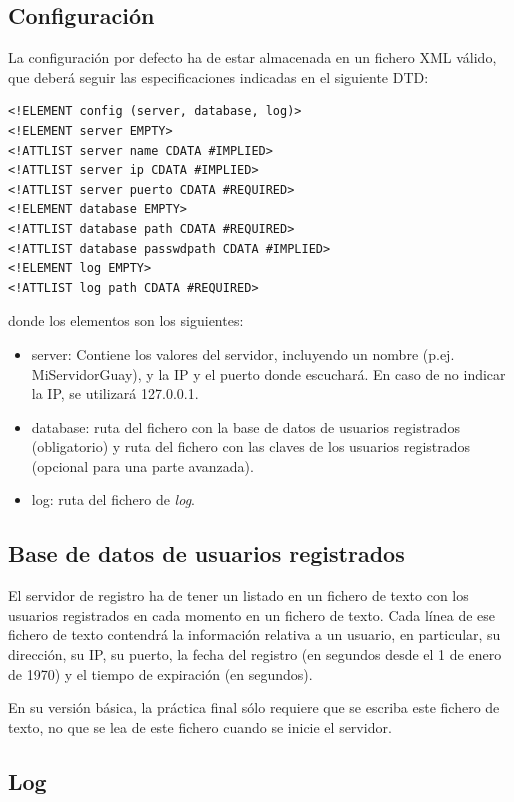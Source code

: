 \documentclass[a4paper,11pt]{article}
\begin{document}
\subsection{Configuración}

  La configuración por defecto ha de estar almacenada en un fichero XML válido, que deberá seguir las especificaciones indicadas en el siguiente DTD:

\begin{verbatim}
<!ELEMENT config (server, database, log)>
<!ELEMENT server EMPTY>
<!ATTLIST server name CDATA #IMPLIED>
<!ATTLIST server ip CDATA #IMPLIED>
<!ATTLIST server puerto CDATA #REQUIRED>
<!ELEMENT database EMPTY>
<!ATTLIST database path CDATA #REQUIRED>
<!ATTLIST database passwdpath CDATA #IMPLIED>
<!ELEMENT log EMPTY>
<!ATTLIST log path CDATA #REQUIRED>
\end{verbatim}

donde los elementos son los siguientes:

\begin{itemize}
  \item server: Contiene los valores del servidor, incluyendo un nombre (p.ej. MiServidorGuay), y la IP y el puerto donde escuchará. En caso de no indicar la IP, se utilizará 127.0.0.1.
  \item database: ruta del fichero con la base de datos de usuarios registrados (obligatorio) y ruta del fichero con las claves de los usuarios registrados (opcional para una parte avanzada).
  \item log: ruta del fichero de \emph{log}.
\end{itemize}

\subsection{Base de datos de usuarios registrados}

El servidor de registro ha de tener un listado en un fichero de texto con los usuarios registrados en cada momento en un fichero de texto. Cada línea de ese fichero de texto contendrá la información relativa a un usuario, en particular, su dirección, su IP, su puerto, la fecha del registro (en segundos desde el 1 de enero de 1970) y el tiempo de expiración (en segundos).

En su versión básica, la práctica final sólo requiere que se escriba este fichero de texto, no que se lea de este fichero cuando se inicie el servidor.

\subsection{Log}
\end{document}
